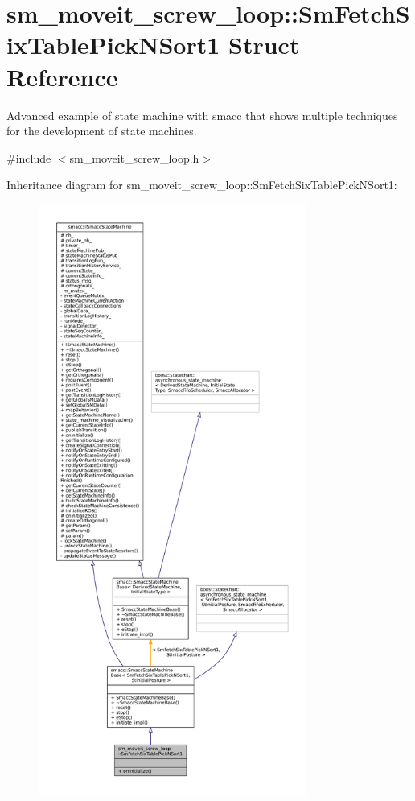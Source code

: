 \hypertarget{structsm__moveit__screw__loop_1_1SmFetchSixTablePickNSort1}{}\section{sm\+\_\+moveit\+\_\+screw\+\_\+loop\+:\+:Sm\+Fetch\+Six\+Table\+Pick\+N\+Sort1 Struct Reference}
\label{structsm__moveit__screw__loop_1_1SmFetchSixTablePickNSort1}


Advanced example of state machine with smacc that shows multiple techniques for the development of state machines.  




{\ttfamily \#include $<$sm\+\_\+moveit\+\_\+screw\+\_\+loop.\+h$>$}



Inheritance diagram for sm\+\_\+moveit\+\_\+screw\+\_\+loop\+:\+:Sm\+Fetch\+Six\+Table\+Pick\+N\+Sort1\+:
\nopagebreak
\begin{figure}[H]
\begin{center}
\leavevmode
\includegraphics[height=550pt]{structsm__moveit__screw__loop_1_1SmFetchSixTablePickNSort1__inherit__graph}
\end{center}
\end{figure}


